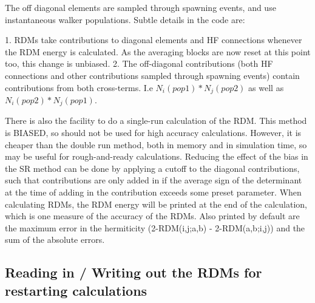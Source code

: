 \documentclass[a4paper,notitlepage,dvipsnames]{scrreprt}
\begin{document}
The off diagonal elements are sampled through spawning events, and use instantaneous walker populations.
Subtle details in the code are:

1. RDMs take contributions to diagonal elements and HF connections whenever the RDM energy is calculated.
   As the averaging blocks are now reset at this point too, this change is unbiased.
2. The off-diagonal contributions (both HF connections and other contributions sampled through spawning
   events) contain contributions from both cross-terms. I.e $N_i(pop1)*N_j(pop2)$ as well as
   $N_i(pop2)*N_j(pop1)$.

There is also the facility to do a single-run calculation of the RDM.  This method is BIASED, so should
not be used for high accuracy calculations.  However, it is cheaper than the double run method, both in
memory and in simulation time, so may be useful for rough-and-ready calculations.
Reducing the effect of the bias in the SR method can be done by applying a cutoff to the diagonal contributions, such that
contributions are only added in if the average sign of the determinant at the time of adding in the contribution exceeds
some preset parameter.
When calculating RDMs, the RDM energy will be printed at the end of the
calculation, which is one measure of the accuracy of the RDMs.  Also printed by default are the maximum error in the
    hermiticity (2-RDM(i,j;a,b) - 2-RDM(a,b;i,j)) and the sum of the absolute errors.

\subsection{Reading in / Writing out the RDMs for restarting calculations}
\end{document}
